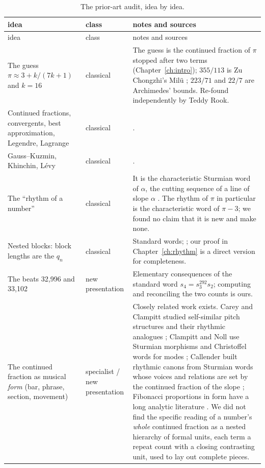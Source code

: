 \begin{longtable}{p{}p{}p{}}
\caption[The prior-art audit]{The prior-art audit, idea by idea.}\label{tab:audit}\\
\toprule
idea & class & notes and sources \\
\midrule
\endfirsthead
\toprule
idea & class & notes and sources \\
\midrule
\endhead
\bottomrule
\endfoot
The guess $\pi \approx 3 + k/(7k+1)$ and $k = 16$ & classical & The guess is the continued fraction of $\pi$ stopped after two terms (Chapter~\ref{ch:intro}); $355/113$ is Zu Chongzhi's Milü \citep{Martzloff2006}; $223/71$ and $22/7$ are Archimedes' bounds. Re-found independently by Teddy Rook. \\
Continued fractions, convergents, best approximation, Legendre, Lagrange & classical & \citet{Khinchin1964,HardyWright2008}. \\
Gauss--Kuzmin, Khinchin, Lévy & classical & \citet{Kuzmin1928,Levy1929,Khintchine1935,Levy1936}. \\
The ``rhythm of a number'' & classical & It is the characteristic Sturmian word of $\alpha$, the cutting sequence of a line of slope $\alpha$ \citep{Lothaire2002,AlloucheShallit2003,BerstelChristoffel2009}. The rhythm of $\pi$ in particular is the characteristic word of $\pi - 3$; we found no claim that it is new and make none. \\
Nested blocks: block lengths are the $q_n$ & classical & Standard words; \citet{FraenkelMushkinTassa1978,Brown1993}; our proof in Chapter~\ref{ch:rhythm} is a direct version for completeness. \\
The beats 32,996 and 33,102 & new presentation & Elementary consequences of the standard word $s_4 = s_3^{292}s_2$; computing and reconciling the two counts is ours. \\
The continued fraction as musical \emph{form} (bar, phrase, section, movement) & specialist / new presentation & Closely related work exists. Carey and Clampitt studied self-similar pitch structures and their rhythmic analogues \citep{CareyClampitt1989,CareyClampitt1996}; Clampitt and Noll use Sturmian morphisms and Christoffel words for modes \citep{ClampittNoll2011,DominguezClampittNoll2009}; Callender built rhythmic canons from Sturmian words whose voices and relations are set by the continued fraction of the slope \citep{Callender2013,Callender2015}; Fibonacci proportions in form have a long analytic literature \citep{Lendvai2000}. We did not find the specific reading of a number's \emph{whole} continued fraction as a nested hierarchy of formal units, each term a repeat count with a closing contrasting unit, used to lay out complete pieces. \\

\end{longtable}
